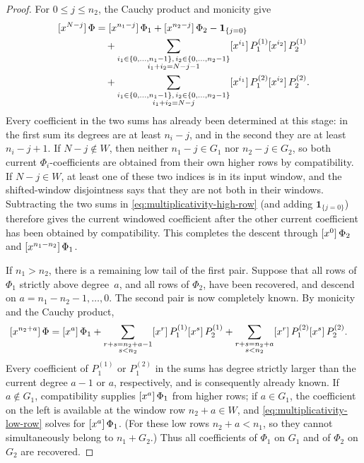\begin{proof}
    For $0\le j\le n_2$, the Cauchy product and monicity give
    \begin{align}
      \coeff{\Phi}{N-j}
        &=\coeff{\Phi_1}{n_1-j}+\coeff{\Phi_2}{n_2-j}
          -\mathbf 1_{\{j=0\}} \notag\\
        &\quad+
        \sum_{\substack{i_1\in\rng{n_1},\,i_2\in\rng{n_2}\\
                         i_1+i_2=N-j-1}}
          \coeff{P^{(1)}_1}{i_1}\coeff{P^{(1)}_2}{i_2}\notag\\
        &\quad+
        \sum_{\substack{i_1\in\rng{n_1},\,i_2\in\rng{n_2}\\
                         i_1+i_2=N-j}}
          \coeff{P^{(2)}_1}{i_1}\coeff{P^{(2)}_2}{i_2}.
      \label{eq:multiplicativity-high-row}
    \end{align}
    Every coefficient in the two sums has already been determined at this
    stage: in the first sum its degrees are at least $n_i-j$, and in the
    second they are at least $n_i-j+1$.  If $N-j\notin W$, then neither
    $n_1-j\in G_1$ nor $n_2-j\in G_2$, so both current $\Phi_i$-coefficients
    are obtained from their own higher rows by compatibility.  If
    $N-j\in W$, at least one of these two indices is in its input window,
    and the shifted-window disjointness says that they are not both in their
    windows.  Subtracting the two sums in \eqref{eq:multiplicativity-high-row}
    (and adding $\mathbf 1_{\{j=0\}}$) therefore gives the current windowed
    coefficient after the other current coefficient has been obtained by
    compatibility.  This completes the descent through
    $\coeff{\Phi_2}{0}$ and $\coeff{\Phi_1}{n_1-n_2}$.

    If $n_1>n_2$, there is a remaining low tail of the first pair.  Suppose
    that all rows of $\Phi_1$ strictly above degree~$a$, and all rows of
    $\Phi_2$, have been recovered, and descend on
    $a=n_1-n_2-1,\ldots,0$.  The second pair is now completely known.  By
    monicity and the Cauchy product,
    \begin{align}
      \coeff{\Phi}{n_2+a}
        &=\coeff{\Phi_1}{a}
          +\sum_{\substack{r+s=n_2+a-1\\s<n_2}}
             \coeff{P^{(1)}_1}{r}\coeff{P^{(1)}_2}{s}
          +\sum_{\substack{r+s=n_2+a\\s<n_2}}
             \coeff{P^{(2)}_1}{r}\coeff{P^{(2)}_2}{s}.
      \label{eq:multiplicativity-low-row}
    \end{align}
    Every coefficient of $P_1^{(1)}$ or $P_1^{(2)}$ in the sums has degree
    strictly larger than the current degree $a-1$ or $a$, respectively, and
    is consequently already known.  If $a\notin G_1$, compatibility supplies
    $\coeff{\Phi_1}{a}$ from higher rows; if $a\in G_1$, the coefficient on
    the left is available at the window row $n_2+a\in W$, and
    \eqref{eq:multiplicativity-low-row} solves for $\coeff{\Phi_1}{a}$.
    (For these low rows $n_2+a<n_1$, so they cannot simultaneously belong to
    $n_1+G_2$.)  Thus all coefficients of $\Phi_1$ on $G_1$ and of
    $\Phi_2$ on $G_2$ are recovered.


\end{proof}
